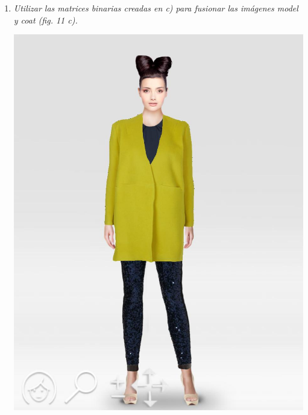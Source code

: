 \documentclass[a4paper,10pt]{article}
\begin{document}
\begin{enumerate}
\begin{enumerate}
 \item \textit{Utilizar las matrices binarias creadas en c) para fusionar las imágenes 
model y coat (fig. 11 c).}

 \begin{center}
 \includegraphics[scale=0.2]{model_coat} 
 \end{center}

 \end{enumerate} 
 
\end{enumerate}
\end{document}
